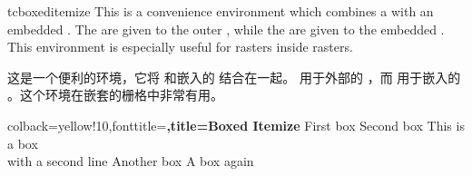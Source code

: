 \begin{docEnvironment}[doc new=2016-04-27]{tcboxeditemize}{}
This is a convenience environment which combines a  with
an embedded . The  are given to the
outer , while the  are given to the
embedded .
This environment is especially useful for rasters inside rasters.

这是一个便利的环境，它将  和嵌入的  结合在一起。 用于外部的 ，而  用于嵌入的 。这个环境在嵌套的栅格中非常有用。
\begin{dispExample}
\begin{tcboxeditemize}[raster columns=3, raster equal height,
size=small,colframe=red!50!black,colback=red!10!white,colbacktitle=red!50!white,
title={Box \# \thetcbrasternum}]
{colback=yellow!10,fonttitle=\bfseries,title=Boxed Itemize}
\tcbitem First box
\tcbitem Second box
\tcbitem This is a box\\with a second line
\tcbitem Another box
\tcbitem A box again
\end{tcboxeditemize}
\end{dispExample}
\end{docEnvironment}

